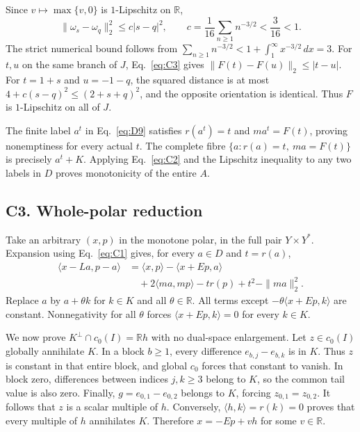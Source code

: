 \documentclass[11pt]{article}
\newcommand{\R}{\mathbb R}
\newcommand{\pair}[2]{\langle #1,#2\rangle}
\begin{document}
Since $v\mapsto\max\{v,0\}$ is $1$-Lipschitz on $\R$,
\begin{equation}
\|\omega_s-\omega_q\|_2^2\le c|s-q|^2,\qquad
c=\frac1{16}\sum_{n\ge1}n^{-3/2}<\frac3{16}<1.
\tag{C3}\label{eq:C3}
\end{equation}
The strict numerical bound follows from
$\sum_{n\ge1}n^{-3/2}<1+\int_1^\infty x^{-3/2}\,dx=3$.
For $t,u$ on the same branch of $J$, Eq.~\eqref{eq:C3} gives
$\|F(t)-F(u)\|_2\le|t-u|$. For $t=1+s$ and $u=-1-q$, the squared
distance is at most $4+c(s-q)^2\le(2+s+q)^2$, and the opposite
orientation is identical. Thus $F$ is $1$-Lipschitz on all of $J$.

The finite label $a^t$ in Eq.~\eqref{eq:D9} satisfies $r(a^t)=t$ and
$ma^t=F(t)$, proving nonemptiness for every actual $t$. The complete
fibre $\{a:r(a)=t,\ ma=F(t)\}$ is precisely $a^t+K$.
Applying Eq.~\eqref{eq:C2} and the Lipschitz inequality to any two labels
in $D$ proves monotonicity of the entire $A$.

\subsection{C3. Whole-polar reduction}
\label{sec:C3}
Take an arbitrary $(x,p)$ in the monotone polar, in the full pair
$Y\times Y^*$. Expansion using Eq.~\eqref{eq:C1} gives, for every
$a\in D$ and $t=r(a)$,
\begin{equation}
\begin{aligned}
\pair{x-La}{p-a}
 &=\pair{x}{p}-\pair{x+Ep}{a}\\
 &\quad+2\pair{ma}{mp}-t r(p)+t^2-\|ma\|_2^2.
\end{aligned}
\tag{C4}\label{eq:C4}
\end{equation}
Replace $a$ by $a+\theta k$ for $k\in K$ and all $\theta\in\R$.
All terms except $-\theta\pair{x+Ep}{k}$ are constant.
Nonnegativity for all $\theta$ forces $\pair{x+Ep}{k}=0$ for every $k\in K$.

We now prove $K^\perp\cap c_0(I)=\R h$ with no dual-space enlargement.
Let $z\in c_0(I)$ globally annihilate $K$. In a block $b\ge1$, every
difference $e_{b,j}-e_{b,k}$ is in $K$. Thus $z$ is constant in that
entire block, and global $c_0$ forces that constant to vanish. In block
zero, differences between indices $j,k\ge3$ belong to $K$, so the common
tail value is also zero. Finally, $g=e_{0,1}-e_{0,2}$ belongs to $K$,
forcing $z_{0,1}=z_{0,2}$. It follows that $z$ is a scalar multiple of
$h$. Conversely, $\pair{h}{k}=r(k)=0$ proves that every multiple of $h$
annihilates $K$. Therefore $x=-Ep+vh$ for some $v\in\R$.
\end{document}
